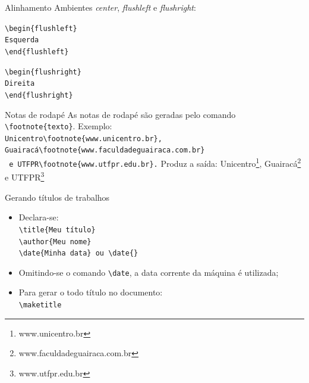 \begin{frame}[fragile]{Alinhamento}
Ambientes \emph{center}, \emph{flushleft} e \emph{flushright}:\\


\begin{flushleft}
\verb|\begin{flushleft}|\\
\verb|Esquerda|\\
\verb|\end{flushleft}|\\
\end{flushleft}

\begin{flushright}
\verb|\begin{flushright}|\\
\verb|Direita|\\
\verb|\end{flushright}|\\
\end{flushright}
\end{frame}


\begin{frame}[fragile]{Notas de rodap\'e}
As notas de rodap\'e s\~ao geradas pelo comando \verb|\footnote{texto}|. Exemplo:
\\
\verb|Unicentro\footnote{www.unicentro.br},| \\
\verb|Guairacá\footnote{www.faculdadeguairaca.com.br}|\\
\verb| e UTFPR\footnote{www.utfpr.edu.br}.|
\newline \newline
Produz a sa\'ida:
\newline \newline
Unicentro\footnote{www.unicentro.br}, Guairac\'a\footnote{www.faculdadeguairaca.com.br} e UTFPR\footnote{www.utfpr.edu.br}
\end{frame}

\begin{frame}[fragile]{Gerando t\'itulos de trabalhos}
\begin{itemize}
\item Declara-se:\\
\verb|\title{Meu título}|\\
\verb|\author{Meu nome}|\\
\verb|\date{Minha data} ou \date{}|
\item Omitindo-se o comando \verb|\date|, a data corrente da m\'aquina \'e utilizada;
\item Para gerar o todo t\'itulo no documento: \\
\verb|\maketitle|
\end{itemize}
\end{frame}


